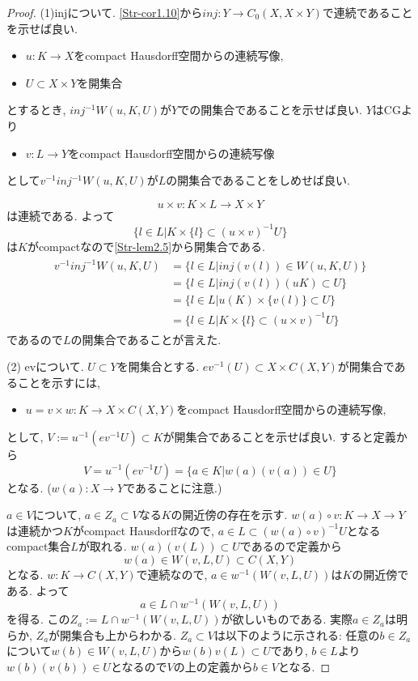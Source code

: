 \documentclass[dvipdfmx,a4paper,11pt]{article}
\theoremstyle{definition}
\begin{document}
\begin{proof}
(1)injについて. 
\ref{Str-cor1.10}から$inj : Y \to C_0(X,X \times Y)$で連続であることを示せば良い.
\begin{itemize}
\item $u : K \to X$をcompact Hausdorff空間からの連続写像, 
\item $U \subset X \times Y$を開集合
\end{itemize}
とするとき, 
$inj^{-1}W(u,K,U)$が$Y$での開集合であることを示せば良い.
$Y$はCGより
\begin{itemize}
\item $v : L \to Y$をcompact Hausdorff空間からの連続写像
\end{itemize}
として$v^{-1} inj^{-1}W(u,K,U)$が$L$の開集合であることをしめせば良い.

$$
u \times v : K \times L \to X \times Y
$$
は連続である. よって
$$ \{ l \in L | K \times \{ l\} \subset (u \times v)^{-1}U \}
$$
は$K$がcompactなので\ref{Str-lem2.5}から開集合である. 
\begin{align*}
\begin{split}
v^{-1} inj^{-1}W(u,K,U)
&=\{ l \in L | inj(v(l)) \in W(u,K,U) \} \\
&= \{ l \in L | inj(v(l)) (uK) \subset U \} \\
&=\{ l \in L |  u(K) \times \{v(l) \}\subset U\}\\
&= \{ l \in L | K \times \{ l\} \subset (u \times v)^{-1}U \}
\end{split}
\end{align*}
であるので$L$の開集合であることが言えた. 

(2) evについて.
 $U \subset Y$を開集合とする.
 $ev^{-1}(U) \subset X \times C(X,Y)$が開集合であることを示すには, 
 \begin{itemize}
\item $u=v\times w : K \to X \times C(X,Y)$をcompact Hausdorff空間からの連続写像, 
\end{itemize}
 として,  $V:=u^{-1} (ev^{-1}U) \subset K$が開集合であることを示せば良い.
 すると定義から
 $$
V= u^{-1}(ev^{-1}U )
=\{a \in K | w(a)(v(a))  \in U\}
 $$
 となる. ($w(a) : X\to Y$であることに注意.)
 
 $a \in V$について, $a \in Z_a \subset V$なる$K$の開近傍の存在を示す. 
 $w(a) \circ v : K \to X \to Y$は連続かつ$K$がcompact Hausdorffなので, 
 $a \in L \subset (w(a) \circ v)^{-1}U $となるcompact集合$L$が取れる.
 $w(a)(v(L)) \subset U$であるので定義から
 $$
 w(a) \in W(v,L,U) \subset C(X,Y)
 $$
 となる. 
 $w : K \to C(X,Y)$で連続なので, $a \in w^{-1}(W(v,L,U))$は$K$の開近傍である.
 よって
 $$
 a \in L \cap w^{-1}(W(v,L,U))
 $$
 を得る. この$Z_a := L \cap w^{-1}(W(v,L,U))$が欲しいものである.
 実際$a \in Z_a$は明らか, $Z_a$が開集合も上からわかる. $ Z_a\subset V$は以下のように示される: 
 任意の$b \in Z_a$について$w(b) \in W(v,L,U) $から$w(b) v(L) \subset U$であり, $b \in L$より
 $w(b)(v(b)) \in U$となるので$V$の上の定義から$b \in V$となる.
\end{proof}
\end{document}
